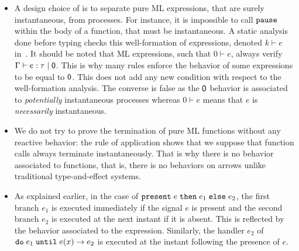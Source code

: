 \documentclass[9pt,preprint]{sigplanconf}
\begin{document}
\begin{itemize}

\item A design choice of \rml{} is to separate pure ML expressions, that are surely instantaneous, from processes. For instance, it is impossible to call $\mathtt{pause}$ within the body of a function, that must be instantaneous. A static analysis done before typing checks this well-formation of expressions, denoted $k \vdash e$ in~\cite{Mandel:2005}. It should be noted that ML expressions, such that $0 \vdash e$, always verify $\Gamma \vdash e : \tau \mid \textsf{0}$. This is why many rules enforce the behavior of some expressions to be equal to $\textsf{0}$. This does not add any new condition with respect to the well-formation analysis. The converse is false as the $\textsf{0}$ behavior is associated to \emph{potentially} instantaneous processes whereas $0 \vdash e$ means that $e$ is \emph{necessarily} instantaneous.

\item We do not try to prove the termination of pure ML functions without any reactive behavior: the rule of application shows that we suppose that function calls always terminate instantaneously. That is why there is no behavior associated to functions, that is, there is no behaviors on arrows unlike traditional type-and-effect systems.

\item As explained earlier, in the case of $\mathtt{present}\; e \;\mathtt{then}\; e_1 \;\mathtt{else}\; e_2$, the first branch $e_1$ is executed immediately if the signal $e$ is present and the second branch $e_2$ is executed at the next instant if it is absent. This is reflected by the behavior associated to the expression. Similarly, the handler $e_2$ of $\mathtt{do}\; e_1 \;\mathtt{until}\; e(x) \rightarrow e_2$ is executed at the instant following the presence of $e$.


\end{itemize}
\end{document}
